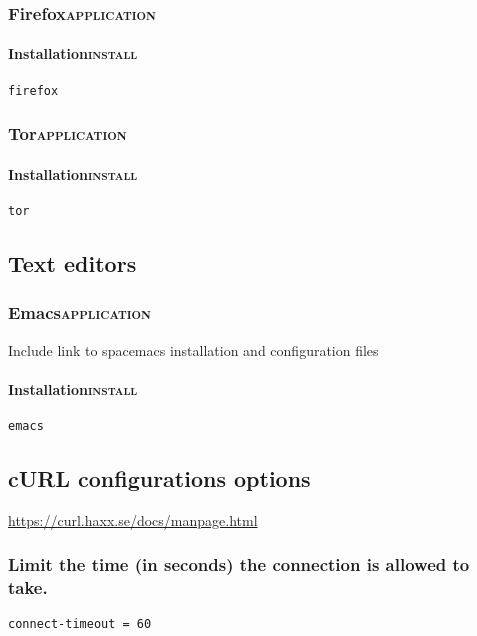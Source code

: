 \documentclass[11pt]{article}
\begin{document}
\subsubsection{Firefox\hfill{}\textsc{application}}
\label{sec:orgcc4820e}
\paragraph{Installation\hfill{}\textsc{install}}
\label{sec:orga9d439e}
\begin{verbatim}
firefox
\end{verbatim}

\subsubsection{Tor\hfill{}\textsc{application}}
\label{sec:org297533e}
\paragraph{Installation\hfill{}\textsc{install}}
\label{sec:orgf82848e}
\begin{verbatim}
tor
\end{verbatim}

\subsection{Text editors}
\label{sec:orgb958959}
\subsubsection{Emacs\hfill{}\textsc{application}}
\label{sec:org67655fe}

Include link to spacemacs installation and configuration files
\paragraph{Installation\hfill{}\textsc{install}}
\label{sec:orgf4e8df1}
\begin{verbatim}
emacs
\end{verbatim}

\subsection{cURL configurations options}
\label{sec:orgc7debc7}

\url{https://curl.haxx.se/docs/manpage.html}


\subsubsection{Limit the time (in seconds) the connection is allowed to take.}
\label{sec:org3fba4f8}
\begin{verbatim}
connect-timeout = 60
\end{verbatim}
\end{document}
